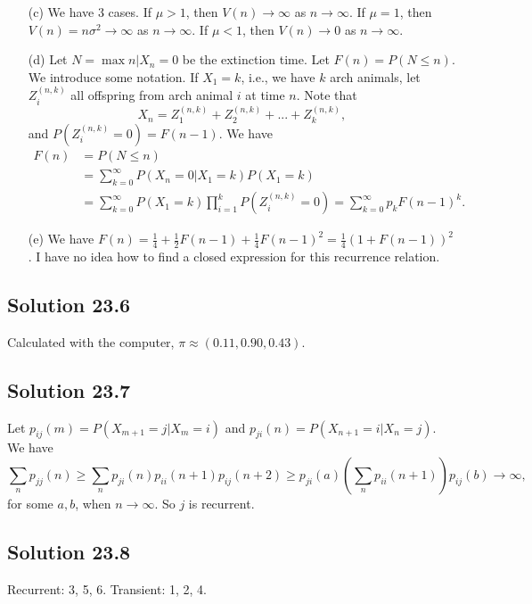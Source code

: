 \begin{itemize}
    \item[(c)] We have 3 cases.
        If $\mu > 1$, then $V(n) \to \infty$ as $n \to \infty$.
        If $\mu = 1$, then $V(n) = n \sigma^2 \to \infty$ as $n \to \infty$.
        If $\mu < 1$, then $V(n) \to 0$ as $n \to \infty$.
    \item[(d)] Let $N = \max{n | X_n = 0}$ be the extinction time.
        Let $F(n) = P(N \leq n)$.
        We introduce some notation.
        If $X_1 = k$, i.e., we have $k$ arch animals, let $Z_i^{(n, k)}$ all offspring from arch animal $i$ at time $n$.
        Note that
        \begin{equation*}
            X_n = Z_1^{(n, k)} + Z_2^{(n, k)} + ... + Z_k^{(n, k)},
        \end{equation*}
        and $P(Z_i^{(n, k)} = 0) = F(n - 1)$.
        We have
        \begin{equation*}
            \begin{split}
                F(n) &= P(N \leq n) \\
                    &= \sum_{k = 0}^{\infty} P(X_n = 0 | X_1 = k) P(X_1 = k) \\
                    &= \sum_{k = 0}^{\infty} P(X_1 = k) \prod_{i = 1}^k P(Z_i^{(n, k)} = 0)
                    = \sum_{k = 0}^{\infty} p_k F(n - 1)^k.
            \end{split}
        \end{equation*}
    \item[(e)] We have $F(n) = \frac{1}{4} + \frac{1}{2} F(n - 1) + \frac{1}{4} F(n - 1)^2 = \frac{1}{4}(1 + F(n - 1))^2$.
        I have no idea how to find a closed expression for this recurrence relation.
\end{itemize}


\subsection*{Solution 23.6}

Calculated with the computer, $\pi \approx (0.11, 0.90, 0.43)$.


\subsection*{Solution 23.7}

Let $p_{ij}(m) = P(X_{m + 1} = j | X_m = i)$ and $p_{ji}(n) = P(X_{n + 1} = i | X_n = j)$.
We have
\begin{equation*}
    \sum_{n} p_{jj}(n) \geq \sum_n p_{ji}(n) p_{ii}(n + 1) p_{ij}(n + 2)
        \geq p_{ji}(a) \left( \sum_n p_{ii}(n + 1) \right) p_{ij}(b)
        \to \infty,
\end{equation*}
for some $a, b$, when $n \to \infty$.
So $j$ is recurrent.


\subsection*{Solution 23.8}

Recurrent: 3, 5, 6.
Transient: 1, 2, 4.
